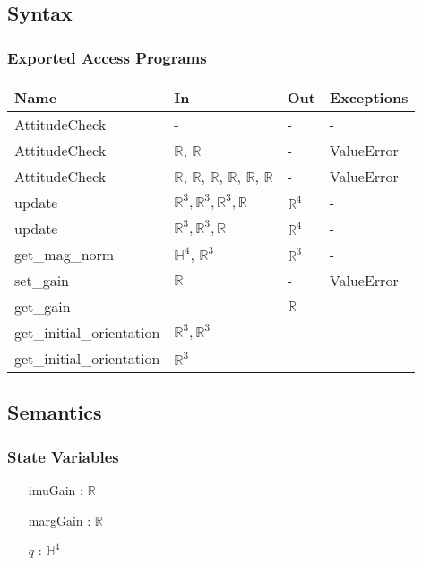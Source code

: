 \documentclass[12pt, titlepage]{article}
\begin{document}
\subsection{Syntax}

\subsubsection{Exported Access Programs}

\begin{center}
\begin{tabular}{p{5cm} p{4cm} p{1.5cm} p{2.5cm}}
\hline
\textbf{Name} & \textbf{In} & \textbf{Out} & \textbf{Exceptions} \\
\hline
AttitudeCheck & - & - & - \\
AttitudeCheck & $\mathbb{R}$, $\mathbb{R}$ & - & ValueError \\
AttitudeCheck & $\mathbb{R}$, $\mathbb{R}$, $\mathbb{R}$, $\mathbb{R}$, $\mathbb{R}$, $\mathbb{R}$ &
- & ValueError \\
update & $\mathbb{R}^3, \mathbb{R}^3, \mathbb{R}^3, \mathbb{R}$ & $\mathbb{R}^4$ & - \\
update & $\mathbb{R}^3, \mathbb{R}^3, \mathbb{R}$ & $\mathbb{R}^4$ & - \\
get\_mag\_norm & $\mathbb{H}^4$, $\mathbb{R}^3$ & $\mathbb{R}^3$ & - \\
set\_gain & $\mathbb{R}$ & - & ValueError \\
get\_gain & - & $\mathbb{R}$ & - \\
get\_initial\_orientation & $\mathbb{R}^3, \mathbb{R}^3$ & - & - \\
get\_initial\_orientation & $\mathbb{R}^3$ & - & - \\
\hline
\end{tabular}
\end{center}

\subsection{Semantics}

\subsubsection{State Variables}
\begin{itemize}
  \item[imuGain] : $\mathbb{R}$
  \item[margGain] : $\mathbb{R}$
  \item[$q$] :  $\mathbb{H}^4$
\end{itemize}
\end{document}
